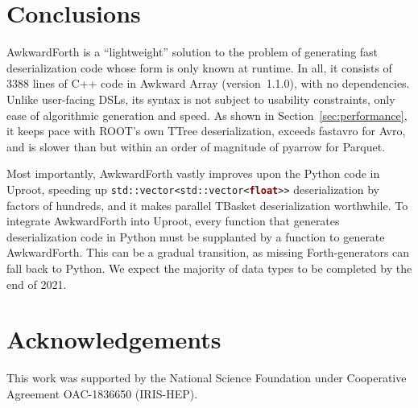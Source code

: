 \documentclass{webofc}
\begin{document}
\section{Conclusions}

AwkwardForth is a ``lightweight'' solution to the problem of generating fast deserialization code whose form is only known at runtime. In all, it consists of 3388 lines of C++ code in Awkward Array (version~1.1.0), with no dependencies. Unlike user-facing DSLs, its syntax is not subject to usability constraints, only ease of algorithmic generation and speed. As shown in Section~\ref{sec:performance}, it keeps pace with ROOT's own TTree deserialization, exceeds fastavro for Avro, and is slower than but within an order of magnitude of pyarrow for Parquet.

Most importantly, AwkwardForth vastly improves upon the Python code in Uproot, speeding up {\tt std::vector<std::vector<\textcolor{Maroon}{\textbf{float}}>{}>} deserialization by factors of hundreds, and it makes parallel TBasket deserialization worthwhile. To integrate AwkwardForth into Uproot, every function that generates deserialization code in Python must be supplanted by a function to generate AwkwardForth. This can be a gradual transition, as missing Forth-generators can fall back to Python. We expect the majority of data types to be completed by the end of 2021.

\vspace{-0.25 cm}
\section{Acknowledgements}

This work was supported by the National Science Foundation under Cooperative Agreement OAC-1836650 (IRIS-HEP).






\end{document}
